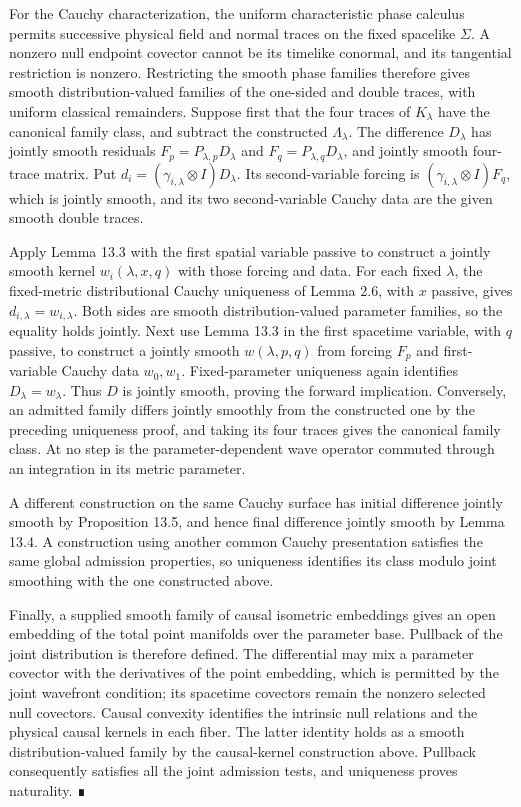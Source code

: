\documentclass[
  english,
  11pt,
  reqno]{amsart}
\begin{document}
For the Cauchy characterization, the uniform characteristic phase
calculus permits successive physical field and normal traces on the
fixed spacelike \(\Sigma\). A nonzero null endpoint covector cannot be
its timelike conormal, and its tangential restriction is nonzero.
Restricting the smooth phase families therefore gives smooth
distribution-valued families of the one-sided and double traces, with
uniform classical remainders. Suppose first that the four traces of
\(K_\lambda\) have the canonical family class, and subtract the
constructed \(\Lambda_\lambda\). The difference \(D_\lambda\) has
jointly smooth residuals \(F_p=P_{\lambda,p}D_\lambda\) and
\(F_q=P_{\lambda,q}D_\lambda\), and jointly smooth four-trace matrix.
Put \(d_i=(\gamma_{i,\lambda}\otimes I)D_\lambda\). Its second-variable
forcing is \((\gamma_{i,\lambda}\otimes I)F_q\), which is jointly
smooth, and its two second-variable Cauchy data are the given smooth
double traces.

Apply Lemma 13.3 with the first spatial variable passive to construct a
jointly smooth kernel \(w_i(\lambda,x,q)\) with those forcing and data.
For each fixed \(\lambda\), the fixed-metric distributional Cauchy
uniqueness of Lemma 2.6, with \(x\) passive, gives
\(d_{i,\lambda}=w_{i,\lambda}\). Both sides are smooth
distribution-valued parameter families, so the equality holds jointly.
Next use Lemma 13.3 in the first spacetime variable, with \(q\) passive,
to construct a jointly smooth \(w(\lambda,p,q)\) from forcing \(F_p\)
and first-variable Cauchy data \(w_0,w_1\). Fixed-parameter uniqueness
again identifies \(D_\lambda=w_\lambda\). Thus \(D\) is jointly smooth,
proving the forward implication. Conversely, an admitted family differs
jointly smoothly from the constructed one by the preceding uniqueness
proof, and taking its four traces gives the canonical family class. At
no step is the parameter-dependent wave operator commuted through an
integration in its metric parameter.

A different construction on the same Cauchy surface has initial
difference jointly smooth by Proposition 13.5, and hence final
difference jointly smooth by Lemma 13.4. A construction using another
common Cauchy presentation satisfies the same global admission
properties, so uniqueness identifies its class modulo joint smoothing
with the one constructed above.

Finally, a supplied smooth family of causal isometric embeddings gives
an open embedding of the total point manifolds over the parameter base.
Pullback of the joint distribution is therefore defined. The
differential may mix a parameter covector with the derivatives of the
point embedding, which is permitted by the joint wavefront condition;
its spacetime covectors remain the nonzero selected null covectors.
Causal convexity identifies the intrinsic null relations and the
physical causal kernels in each fiber. The latter identity holds as a
smooth distribution-valued family by the causal-kernel construction
above. Pullback consequently satisfies all the joint admission tests,
and uniqueness proves naturality. ∎
\end{document}
